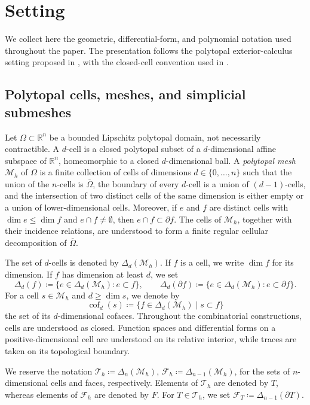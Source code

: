 \documentclass[a4paper,11pt]{article}
\theoremstyle{definition}
\newcommand{\Real}{\mathbb{R}}
\newcommand{\Mh}{\mathcal{M}_h}
\newcommand{\FM}[1]{\Delta_{#1}}
\newcommand{\cof}[1]{\operatorname{cof}_{#1}}
\begin{document}
\section{Setting}
\label{sec:setting}
We collect here the geometric, differential-form, and polynomial notation used throughout the paper.
The presentation follows the polytopal exterior-calculus setting proposed in \cite{Bonaldi.Di-Pietro.ea:24}, with the closed-cell convention used in \cite{Di-Pietro.Droniou.ea:25,Di-Pietro.Droniou.Pitassi:25}.

\subsection{Polytopal cells, meshes, and simplicial submeshes}
\label{sec:setting:mesh}

Let $\Omega\subset\Real^n$ be a bounded Lipschitz polytopal domain, not necessarily contractible.
A $d$-cell is a closed polytopal subset of a $d$-dimensional affine subspace of $\Real^n$, homeomorphic to a closed $d$-dimensional ball.
A \emph{polytopal mesh} $\Mh$ of $\Omega$ is a finite collection of cells of dimensions $d\in\{0,\ldots,n\}$ such that the union of the $n$-cells is $\overline\Omega$, the boundary of every $d$-cell is a union of $(d-1)$-cells, and the intersection of two distinct cells of the same dimension is either empty or a union of lower-dimensional cells.
Moreover, if $e$ and $f$ are distinct cells with $\dim e\leq\dim f$ and $e\cap f\neq\emptyset$, then $e\cap f\subset\partial f$.
The cells of $\Mh$, together with their incidence relations, are understood to form a finite regular cellular decomposition of $\overline\Omega$.

The set of $d$-cells is denoted by $\FM{d}(\Mh)$.
If $f$ is a cell, we write $\dim f$ for its dimension.
If $f$ has dimension at least $d$, we set
\[
  \FM{d}(f)
  \coloneqq
  \{e\in\FM{d}(\Mh):e\subset f\},
  \qquad
  \FM{d}(\partial f)
  \coloneqq
  \{e\in\FM{d}(\Mh):e\subset\partial f\}.
\]
For a cell $s\in\Mh$ and $d\geq\dim s$, we denote by
\[
  \cof{d}(s)
  \coloneqq
  \{f\in\FM{d}(\Mh)\mid s\subset f\}
\]
the set of its $d$-dimensional cofaces.
Throughout the combinatorial constructions, cells are understood as closed.
Function spaces and differential forms on a positive-dimensional cell are understood on its relative interior, while traces are taken on its topological boundary.

We reserve the notation $\mathcal T_h\coloneqq\FM{n}(\Mh)$, $\mathcal F_h\coloneqq\FM{n-1}(\Mh)$, for the sets of $n$-dimensional cells and faces, respectively.
Elements of $\mathcal T_h$ are denoted by $T$, whereas elements of $\mathcal F_h$ are denoted by $F$.
For $T\in\mathcal T_h$, we set $\mathcal F_T\coloneqq\FM{n-1}(\partial T)$.
\end{document}
